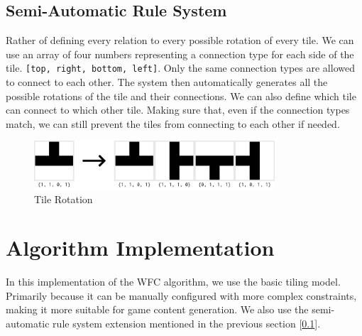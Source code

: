\documentclass[10pt,oneside,a4paper]{article}
\begin{document}
\subsection{Semi-Automatic Rule System}\label{sec:semi-automatic_rule_system}
Rather of defining every relation to every possible rotation of every tile.
We can use an array of four numbers representing a connection type for each side of the tile. \texttt{[top, right, bottom, left]}.
Only the same connection types are allowed to connect to each other.
The system then automatically generates all the possible rotations of the tile and their connections.
We can also define which tile can connect to which other tile. Making sure that, even if the connection types match, we can still prevent the tiles from connecting to each other if needed.
\begin{figure}[ht]
    \centering
    \includegraphics[width=0.8\textwidth]{figures/tile_rotation_example.png}
    \caption{Tile Rotation}\label{fig:tile_rotation_example}
\end{figure}

\section{Algorithm Implementation}\label{sec:implementation}
In this implementation of the WFC algorithm, we use the basic tiling model. Primarily because it can be manually configured with more complex constraints, making it more suitable for game content generation.
We also use the semi-automatic rule system extension mentioned in the previous section [\ref*{sec:semi-automatic_rule_system}].
\end{document}
